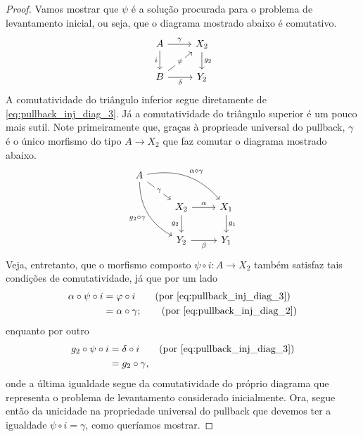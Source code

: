 \begin{proof}
  Vamos mostrar que $\psi$ é a solução procurada para o problema de levantamento inicial, ou seja, que o diagrama mostrado abaixo é comutativo.
  \begin{displaymath}
    \begin{tikzcd}
      A
      \arrow[r, "\gamma"]
      \arrow[d, "i" swap]
      & X_2
      \arrow[d, "g_2"]
      \\ B
      \arrow[r, "\delta" swap]
      \arrow[ru, "\psi" description]
      & Y_2
    \end{tikzcd}
  \end{displaymath}
  A comutatividade do triângulo inferior segue diretamente de \eqref{eq:pullback_inj_diag_3}.
  Já a comutatividade do triângulo superior é um pouco mais sutil.
  Note primeiramente que, graças à proprieade universal do pullback, $\gamma$ é o único morfismo do tipo $A \to X_2$ que faz comutar o diagrama mostrado abaixo.
  \begin{displaymath}
    \begin{tikzcd}
      A
      \arrow[rd, "\gamma" description]
      \arrow[rrd, bend left=30, "\alpha \circ \gamma"]
      \arrow[rdd, bend right=30, "g_2 \circ \gamma" swap]
      \\ & X_2
      \arrow[r, "\alpha"]
      \arrow[d, "g_2" swap]
      & X_1
      \arrow[d, "g_1"]
      \\ & Y_2
      \arrow[r, "\beta" swap]
      & Y_1
    \end{tikzcd}
  \end{displaymath}
  Veja, entretanto, que o morfismo composto $\psi \circ i: A \to X_2$ também satisfaz tais condições de comutatividade, já que por um lado
  \begin{align*}
    \alpha \circ \psi \circ i
    & = \varphi \circ i
    \tag{por \eqref{eq:pullback_inj_diag_3}} \\
    & = \alpha \circ \gamma;
    \tag{por \eqref{eq:pullback_inj_diag_2}}
  \end{align*}
  enquanto por outro
  \begin{align*}
    g_2 \circ \psi \circ i
    & = \delta \circ i
    \tag{por \eqref{eq:pullback_inj_diag_3}} \\
    &  = g_2 \circ \gamma,
  \end{align*}
  onde a última igualdade segue da comutatividade do próprio diagrama que representa o problema de levantamento considerado inicialmente.
  Ora, segue então da unicidade na propriedade universal do pullback que devemos ter a igualdade $\psi \circ i = \gamma$, como queríamos mostrar.


\end{proof}

